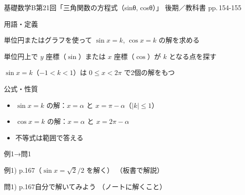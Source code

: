 \documentclass[aspectratio=43,professionalfonts,handout]{beamer}
\newcommand{\LectureNum}{21}
\newcommand{\LectureTitle}{三角関数の方程式（sinθ, cosθ）}
\newcommand{\TextPages}{pp.\,154-155}
\newcommand{\CourseName}{基礎数学B}
\renewcommand{\TermName}{後期}
\begin{document}
\begin{frame}{\CourseName\quad 第\LectureNum 回「\LectureTitle 」}
  {\small \TermName\quad \TeacherName\quad ／\quad 教科書 \TextPages}

  \begin{block}{用語・定義}
  \begin{description}[labelwidth=5.5em]
    \item[\kw{$0 \leq x < 2\pi$ の範囲での解}] 単位円またはグラフを使って $\sin x = k$, $\cos x = k$ の解を求める
    \item[\kw{単位円・グラフを使った解法}] 単位円上で $y$ 座標（$\sin$）または $x$ 座標（$\cos$）が $k$ となる点を探す
    \item[\kw{解の個数の確認}] $\sin x = k$（$-1 < k < 1$）は $0 \leq x < 2\pi$ で2個の解をもつ
  \end{description}
  \end{block}
\end{frame}

\begin{frame}{公式・性質}
  \begin{block}{}
  \begin{itemize}
    \item $\sin x = k$ の解：$x = \alpha$ と $x = \pi - \alpha$（$|k| \leq 1$）
    \item $\cos x = k$ の解：$x = \alpha$ と $x = 2\pi - \alpha$
    \item 不等式は範囲で答える
  \end{itemize}
  \end{block}
\end{frame}

\begin{frame}{例1→問1}
  \begin{exampleblock}{例1) p.167（$\sin x = \sqrt{2}/2$ を解く）}
    （板書で解説）
  \end{exampleblock}

  \vfill

  \begin{block}{問1) p.167\quad 自分で解いてみよう}
    （ノートに解くこと）
  \end{block}
\end{frame}
\end{document}
